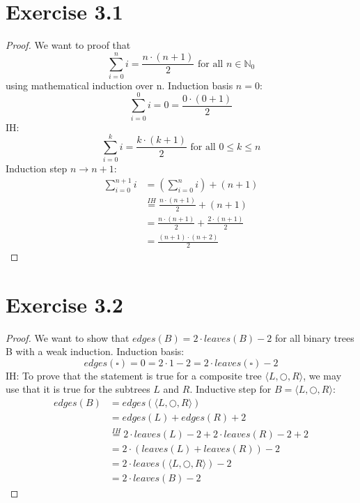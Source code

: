 \documentclass{article} %
\newcommand{\homeworkNumber}{3}
\begin{document}
\section*{Exercise \homeworkNumber.1}

\begin{proof}
We want to proof that \[\sum_{i=0}^{n} i = \frac{n \cdot (n+1)}{2} \text{ for all } n \in \mathbb{N}_0 \] using mathematical induction over n.\newline
\newline
Induction basis $n = 0$: 
\[ \sum_{i=0}^{0} i = 0 = \frac{0 \cdot(0+1)}{2} \]
IH: \[ \sum_{i=0}^{k} i = \frac{k \cdot (k+1)}{2} \text{ for all } 0 \leq k \leq n\]
Induction step $n \rightarrow n+1$:
\begin{align*}
\sum_{i=0}^{n+1} i & = \left( \sum_{i=0}^{n} i \right) + (n+1) \\
& \stackrel{IH}{=} \frac{n \cdot (n+1)}{2} + (n+1) \\
& = \frac{n \cdot (n+1)}{2} + \frac{2\cdot (n+1)}{2} \\
& = \frac{(n+1) \cdot (n+2)}{2}
\end{align*}
\end{proof}

\section*{Exercise \homeworkNumber.2}

\begin{proof}
We want to show that $edges(B) = 2 \cdot leaves(B) -2$ for all binary trees B with a weak induction.\newline
Induction basis: \[ edges(\square) = 0 = 2 \cdot 1 - 2 = 2 \cdot leaves(\square) - 2 \]
IH: To prove that the statement is true for a composite tree $\langle L, \bigcirc ,R  \rangle$, we may use that it is true for the subtrees $L$ and $R$.\newline
Inductive step for $B = \langle L, \bigcirc ,R \rangle$:
\begin{align*}
edges(B) & = edges(\langle L, \bigcirc ,R \rangle) \\
& = edges(L) + edges(R) + 2 \\
& \stackrel{IH}{=} 2 \cdot leaves(L) - 2 + 2 \cdot leaves(R) - 2 + 2 \\
& = 2 \cdot (leaves(L) + leaves(R)) - 2 \\
& = 2 \cdot leaves(\langle L, \bigcirc ,R \rangle) - 2 \\
& = 2 \cdot leaves(B) - 2
\end{align*}
\end{proof}
\end{document}
